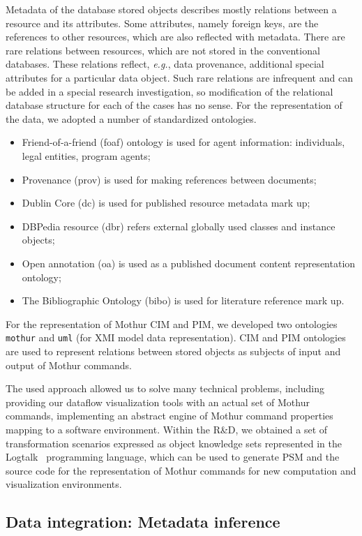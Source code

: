 \documentclass[a4paper]{jpconf}
\begin{document}
Metadata of the database stored objects describes mostly relations between a resource and its attributes.  Some attributes, namely foreign keys, are the references to other resources, which are also reflected with metadata.  There are rare relations between resources, which are not stored in the conventional databases.  These relations reflect, \emph{e.g.}, data provenance, additional special attributes for a particular data object.  Such rare relations are infrequent and can be added in a special research investigation, so modification of the relational database structure for each of the cases has no sense. For the representation of the data, we adopted a number of standardized ontologies.
\begin{itemize}
\item Friend-of-a-friend (foaf) ontology is used for agent
  information: individuals, legal entities, program agents;
\item Provenance
  (prov) is used for making references between documents;
\item Dublin Core
  (dc) is used for published resource metadata mark up;
\item DBPedia
  resource ({dbr}) refers external globally used classes and instance
  objects;
\item Open annotation ({oa}) is used as a published document
  content representation ontology;
\item The Bibliographic Ontology ({bibo})
  is used for literature reference mark up.
\end{itemize}
For the representation of Mothur CIM and PIM, we developed two ontologies
  \texttt{mothur} and \texttt{uml} (for XMI model data
  representation).  CIM and PIM ontologies are used to represent
  relations between stored objects as subjects of input and output of
  Mothur commands.

The used approach allowed us to solve many technical problems, including providing our dataflow visualization tools with an actual set of Mothur commands, implementing an abstract engine of Mothur command properties mapping to a software environment. Within the R\&D, we obtained a set of transformation scenarios expressed as object knowledge sets represented in the Logtalk~\cite{logtalk} programming language, which can be used to generate PSM and the source code for the representation of Mothur commands for new computation and visualization environments.

\subsection{Data integration: Metadata inference}
\end{document}
